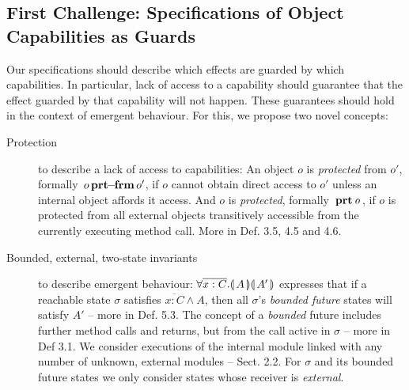 



\subsection{First Challenge: Specifications of Object Capabilities as Guards}
\label{s:approach:necopers}


Our specifications should describe {which effects are guarded by which capabilities}. 
In particular, lack of access to {a capability  should} guarantee  that {the effect guarded by that capability will not happen.}
  {These guarantees should hold  in the context of   emergent behaviour.}   
For this, we propose two %
{novel concepts}:

 
\begin{description}
\item[Protection] to describe a lack of access to capabilities: An object $o$ is \emph{protected} from $o'$, formally ${\, o\, \mathbf{prt\!\!-\!\!frm}\, o'}$,  if $o$ cannot obtain direct access to $o'$ unless an internal object affords it access. %
And $o$ is \emph{protected}, formally ${{\, \mathbf{prt}\, {\texttt{\it{o}}}\, }}$, if $o$ is protected from all external objects transitively accessible from the currently executing method call. More in Def. 3.5, 4.5 and 4.6.
\item[Bounded, external, two-state invariants] to describe emergent behaviour:  $\forall {\overline{x:C}}.{\llparenthesis}\, A \,{\rrparenthesis}{\llparenthesis}\, A' \,{\rrparenthesis}$ expresses that if a reachable state $\sigma$ 
  satisfies ${\overline{x:C}}  \wedge A$, then all $\sigma$'s \emph{bounded future} states will satisfy $A'$ -- more in Def. 5.3. The concept of a \emph{bounded} future includes further method calls and returns, but  from the call active in $\sigma$ -- more in Def 3.1. 
We consider executions of the internal module linked with any number of unknown, external modules -- \cf Sect. 2.2.
 For $\sigma$ and its bounded future states  we only consider states whose receiver is \emph{external}. 
\end{description}

